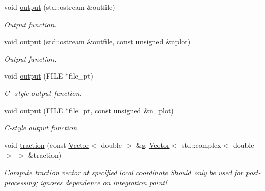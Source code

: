 \begin{DoxyCompactItemize}
void \hyperlink{classoomph_1_1TimeHarmonicLinearElasticityTractionElement_a52aee2a2a24e6bc7c33c67900eb520bf}{output} (std\+::ostream \&outfile)
\begin{DoxyCompactList}\small\item\em Output function. \end{DoxyCompactList}\item 
void \hyperlink{classoomph_1_1TimeHarmonicLinearElasticityTractionElement_a41af8d1a298bc901f8374ccbae137eda}{output} (std\+::ostream \&outfile, const unsigned \&nplot)
\begin{DoxyCompactList}\small\item\em Output function. \end{DoxyCompactList}\item 
void \hyperlink{classoomph_1_1TimeHarmonicLinearElasticityTractionElement_a896a944cd4c351c79ebeb1cde014906d}{output} (F\+I\+LE $\ast$file\+\_\+pt)
\begin{DoxyCompactList}\small\item\em C\+\_\+style output function. \end{DoxyCompactList}\item 
void \hyperlink{classoomph_1_1TimeHarmonicLinearElasticityTractionElement_a091f6a524327b225c8a909d6fb3faec8}{output} (F\+I\+LE $\ast$file\+\_\+pt, const unsigned \&n\+\_\+plot)
\begin{DoxyCompactList}\small\item\em C-\/style output function. \end{DoxyCompactList}\item 
void \hyperlink{classoomph_1_1TimeHarmonicLinearElasticityTractionElement_a29ba3405562f32247d4da72214637151}{traction} (const \hyperlink{classoomph_1_1Vector}{Vector}$<$ double $>$ \&\hyperlink{cfortran_8h_ab7123126e4885ef647dd9c6e3807a21c}{s}, \hyperlink{classoomph_1_1Vector}{Vector}$<$ std\+::complex$<$ double $>$ $>$ \&traction)
\begin{DoxyCompactList}\small\item\em Compute traction vector at specified local coordinate Should only be used for post-\/processing; ignores dependence on integration point! \end{DoxyCompactList}\end{DoxyCompactItemize}
